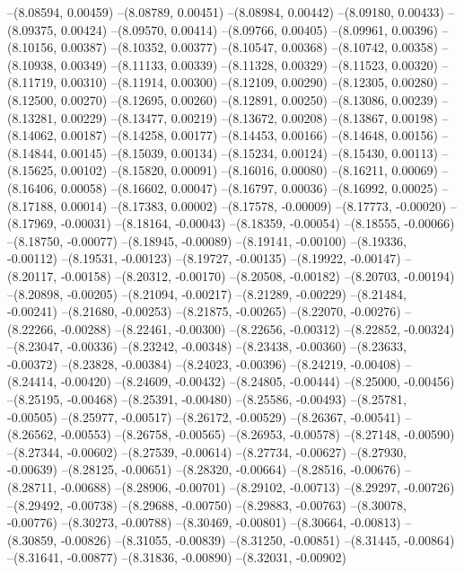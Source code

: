 --(8.08594, 0.00459)
--(8.08789, 0.00451)
--(8.08984, 0.00442)
--(8.09180, 0.00433)
--(8.09375, 0.00424)
--(8.09570, 0.00414)
--(8.09766, 0.00405)
--(8.09961, 0.00396)
--(8.10156, 0.00387)
--(8.10352, 0.00377)
--(8.10547, 0.00368)
--(8.10742, 0.00358)
--(8.10938, 0.00349)
--(8.11133, 0.00339)
--(8.11328, 0.00329)
--(8.11523, 0.00320)
--(8.11719, 0.00310)
--(8.11914, 0.00300)
--(8.12109, 0.00290)
--(8.12305, 0.00280)
--(8.12500, 0.00270)
--(8.12695, 0.00260)
--(8.12891, 0.00250)
--(8.13086, 0.00239)
--(8.13281, 0.00229)
--(8.13477, 0.00219)
--(8.13672, 0.00208)
--(8.13867, 0.00198)
--(8.14062, 0.00187)
--(8.14258, 0.00177)
--(8.14453, 0.00166)
--(8.14648, 0.00156)
--(8.14844, 0.00145)
--(8.15039, 0.00134)
--(8.15234, 0.00124)
--(8.15430, 0.00113)
--(8.15625, 0.00102)
--(8.15820, 0.00091)
--(8.16016, 0.00080)
--(8.16211, 0.00069)
--(8.16406, 0.00058)
--(8.16602, 0.00047)
--(8.16797, 0.00036)
--(8.16992, 0.00025)
--(8.17188, 0.00014)
--(8.17383, 0.00002)
--(8.17578, -0.00009)
--(8.17773, -0.00020)
--(8.17969, -0.00031)
--(8.18164, -0.00043)
--(8.18359, -0.00054)
--(8.18555, -0.00066)
--(8.18750, -0.00077)
--(8.18945, -0.00089)
--(8.19141, -0.00100)
--(8.19336, -0.00112)
--(8.19531, -0.00123)
--(8.19727, -0.00135)
--(8.19922, -0.00147)
--(8.20117, -0.00158)
--(8.20312, -0.00170)
--(8.20508, -0.00182)
--(8.20703, -0.00194)
--(8.20898, -0.00205)
--(8.21094, -0.00217)
--(8.21289, -0.00229)
--(8.21484, -0.00241)
--(8.21680, -0.00253)
--(8.21875, -0.00265)
--(8.22070, -0.00276)
--(8.22266, -0.00288)
--(8.22461, -0.00300)
--(8.22656, -0.00312)
--(8.22852, -0.00324)
--(8.23047, -0.00336)
--(8.23242, -0.00348)
--(8.23438, -0.00360)
--(8.23633, -0.00372)
--(8.23828, -0.00384)
--(8.24023, -0.00396)
--(8.24219, -0.00408)
--(8.24414, -0.00420)
--(8.24609, -0.00432)
--(8.24805, -0.00444)
--(8.25000, -0.00456)
--(8.25195, -0.00468)
--(8.25391, -0.00480)
--(8.25586, -0.00493)
--(8.25781, -0.00505)
--(8.25977, -0.00517)
--(8.26172, -0.00529)
--(8.26367, -0.00541)
--(8.26562, -0.00553)
--(8.26758, -0.00565)
--(8.26953, -0.00578)
--(8.27148, -0.00590)
--(8.27344, -0.00602)
--(8.27539, -0.00614)
--(8.27734, -0.00627)
--(8.27930, -0.00639)
--(8.28125, -0.00651)
--(8.28320, -0.00664)
--(8.28516, -0.00676)
--(8.28711, -0.00688)
--(8.28906, -0.00701)
--(8.29102, -0.00713)
--(8.29297, -0.00726)
--(8.29492, -0.00738)
--(8.29688, -0.00750)
--(8.29883, -0.00763)
--(8.30078, -0.00776)
--(8.30273, -0.00788)
--(8.30469, -0.00801)
--(8.30664, -0.00813)
--(8.30859, -0.00826)
--(8.31055, -0.00839)
--(8.31250, -0.00851)
--(8.31445, -0.00864)
--(8.31641, -0.00877)
--(8.31836, -0.00890)
--(8.32031, -0.00902)
